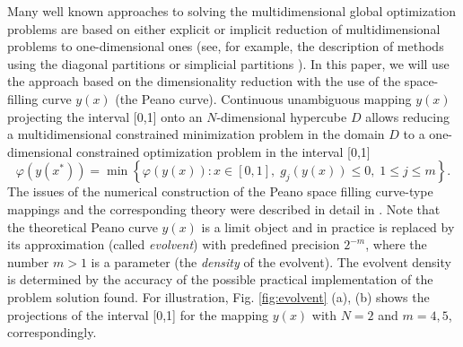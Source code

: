 \documentclass[preprint]{elsarticle}
\begin{document}
	Many well known approaches to solving the multidimensional global optimization problems are based on either explicit or implicit reduction of multidimensional problems to one-dimensional ones (see, for example, the description of methods using the diagonal partitions \cite{Sergeyev2006} or simplicial partitions \cite{Zilinskas2008}). In this paper, we will use the approach based on the dimensionality reduction with the use of the space-filling curve $y(x)$ (the Peano curve). Continuous unambiguous mapping $y(x)$ projecting the interval [0,1] onto an $N$-dimensional hypercube $D$ allows reducing a multidimensional constrained minimization problem in the domain $D$ to a one-dimensional constrained optimization problem in the interval [0,1]
\begin{equation}\label{one_dimensional_problem}
	\varphi(y(x^\ast))=\min \left\{\varphi(y(x)): x \in [0,1], \; g_j(y(x))\leq 0, \; 1 \leq j \leq m\right\}.
\end{equation}
The issues of the numerical construction of the Peano space filling curve-type mappings and the corresponding theory were described in detail in \cite{Strongin2000, Sergeyev2013}. Note that the theoretical Peano curve $y(x)$ is a limit object and in practice is replaced by its approximation (called \textit{evolvent}) with predefined precision $2^{-m}$, where the number $m>1$ is a parameter (the \textit{density} of the evolvent). The evolvent density is determined by the accuracy of the possible practical implementation of the problem solution found. For  illustration, Fig. \ref{fig:evolvent} (a), (b) shows the projections of the interval [0,1] for the mapping $y(x)$ with $N=2$ and $m=4,5$, correspondingly.
\end{document}
